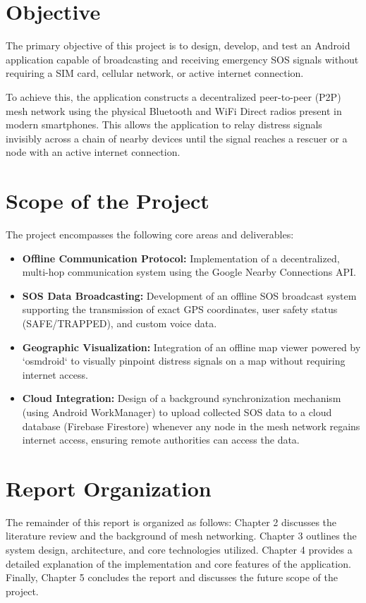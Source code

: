 \section{Objective}
The primary objective of this project is to design, develop, and test an Android application capable of broadcasting and receiving emergency SOS signals without requiring a SIM card, cellular network, or active internet connection. 

To achieve this, the application constructs a decentralized peer-to-peer (P2P) mesh network using the physical Bluetooth and WiFi Direct radios present in modern smartphones. This allows the application to relay distress signals invisibly across a chain of nearby devices until the signal reaches a rescuer or a node with an active internet connection.

\section{Scope of the Project}
The project encompasses the following core areas and deliverables:
\begin{itemize}
    \item \textbf{Offline Communication Protocol:} Implementation of a decentralized, multi-hop communication system using the Google Nearby Connections API.
    \item \textbf{SOS Data Broadcasting:} Development of an offline SOS broadcast system supporting the transmission of exact GPS coordinates, user safety status (SAFE/TRAPPED), and custom voice data.
    \item \textbf{Geographic Visualization:} Integration of an offline map viewer powered by `osmdroid` to visually pinpoint distress signals on a map without requiring internet access.
    \item \textbf{Cloud Integration:} Design of a background synchronization mechanism (using Android WorkManager) to upload collected SOS data to a cloud database (Firebase Firestore) whenever any node in the mesh network regains internet access, ensuring remote authorities can access the data.
\end{itemize}

\section{Report Organization}
The remainder of this report is organized as follows: Chapter 2 discusses the literature review and the background of mesh networking. Chapter 3 outlines the system design, architecture, and core technologies utilized. Chapter 4 provides a detailed explanation of the implementation and core features of the application. Finally, Chapter 5 concludes the report and discusses the future scope of the project.